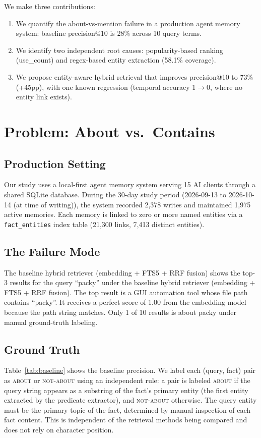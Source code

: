 \documentclass[11pt]{article}
\begin{document}
We make three contributions:
\begin{enumerate}
\item We quantify the about-vs-mention failure in a production agent memory system: baseline precision@10 is 28\% across 10 query terms.
\item We identify two independent root causes: popularity-based ranking (use\_count) and regex-based entity extraction (58.1\% coverage).
\item We propose entity-aware hybrid retrieval that improves precision@10 to 73\% (+45pp), with one known regression (temporal accuracy 1$\to$0, where no entity link exists).
\end{enumerate}

\section{Problem: About vs.\ Contains}

\subsection{Production Setting}

Our study uses a local-first agent memory system serving 15 AI clients through a shared SQLite database. During the 30-day study period (2026-09-13 to 2026-10-14 (at time of writing)), the system recorded 2,378 writes and maintained 1,975 active memories. Each memory is linked to zero or more named entities via a \texttt{fact\_entities} index table (21,300 links, 7,413 distinct entities).

\subsection{The Failure Mode}

The baseline hybrid retriever (embedding + FTS5 + RRF fusion) shows the top-3 results for the query ``packy'' under the baseline hybrid retriever (embedding + FTS5 + RRF fusion). The top result is a GUI automation tool whose file path contains ``packy''. It receives a perfect score of 1.00 from the embedding model because the path string matches. Only 1 of 10 results is about packy under manual ground-truth labeling.

\subsection{Ground Truth}

Table~\ref{tab:baseline} shows the baseline precision. We label each (query, fact) pair as \textsc{about} or \textsc{not-about} using an independent rule: a pair is labeled \textsc{about} if the query string appears as a substring of the fact's primary entity (the first entity extracted by the predicate extractor), and \textsc{not-about} otherwise. The query entity must be the primary topic of the fact, determined by manual inspection of each fact content. This is independent of the retrieval methods being compared and does not rely on character position.
\end{document}
